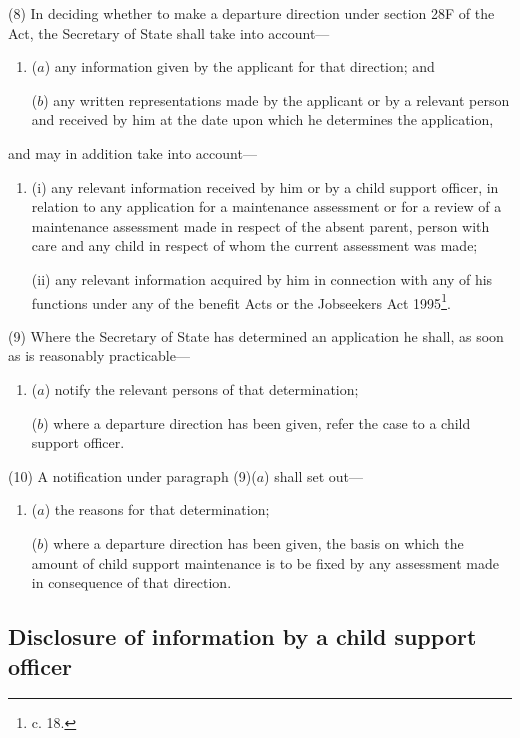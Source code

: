 \documentclass[a4paper]{article}
\begin{document}
(8) In deciding whether to make a departure direction under section 28F of the Act, the Secretary of State shall take into account—
\begin{enumerate}\item[]
($a$) any information given by the applicant for that direction; and

($b$) any written representations made by the applicant or by a relevant person and received by him at the date upon which he determines the application,
\end{enumerate}
and may in addition take into account—
\begin{enumerate}\item[]
(i) any relevant information received by him or by a child support officer, in relation to any application for a maintenance assessment or for a review of a maintenance assessment made in respect of the absent parent, person with care and any child in respect of whom the current assessment was made;

(ii) any relevant information acquired by him in connection with any of his functions under any of the benefit Acts or the Jobseekers Act 1995\footnote{ c. 18.}.
\end{enumerate}

(9) Where the Secretary of State has determined an application he shall, as soon as is reasonably practicable—
\begin{enumerate}\item[]
($a$) notify the relevant persons of that determination;

($b$) where a departure direction has been given, refer the case to a child support officer.
\end{enumerate}

(10) A notification under paragraph (9)($a$) shall set out—
\begin{enumerate}\item[]
($a$) the reasons for that determination;

($b$) where a departure direction has been given, the basis on which the amount of child support maintenance is to be fixed by any assessment made in consequence of that direction.
\end{enumerate}

\subsection[9. Disclosure of information by a child support officer]{Disclosure of information by a child support officer}
\end{document}
